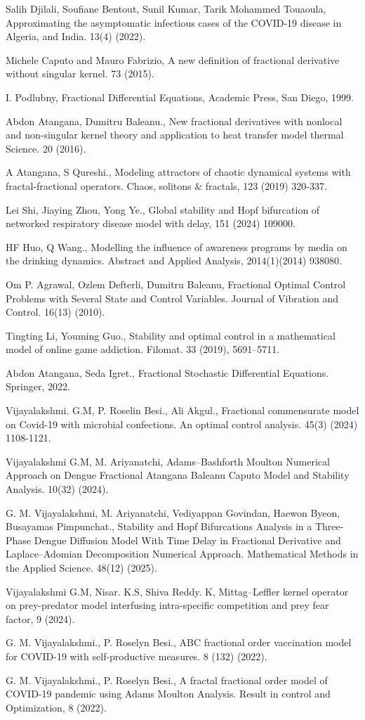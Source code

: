 \documentclass[10pt]{NSP1}
\begin{document}
Salih Djilali, Soufiane Bentout, Sunil Kumar, Tarik Mohammed Touaoula, Approximating the asymptomatic infectious cases of the COVID-19 disease in Algeria, and India. 13(4) (2022).

Michele Caputo and Mauro Fabrizio, A new definition of fractional derivative without singular kernel. 73 (2015).

I. Podlubny, Fractional Differential Equations, Academic Press, San Diego, 1999.

Abdon Atangana, Dumitru Baleanu., New fractional derivatives with nonlocal and non-singular kernel theory and application to heat transfer model thermal Science. 20 (2016).

A Atangana, S Qureshi., Modeling attractors of chaotic dynamical systems with fractal-fractional operators. Chaos, solitons \& fractals, 123 (2019) 320-337.

Lei Shi, Jiaying Zhou, Yong Ye., Global stability and Hopf bifurcation of networked respiratory disease model with delay, 151 (2024) 109000.

HF Huo, Q Wang., Modelling the influence of awareness programs by media on the drinking dynamics. Abstract and Applied Analysis, 2014(1)(2014) 938080.

Om P. Agrawal, Ozlem Defterli, Dumitru Baleanu, Fractional Optimal Control Problems with Several State and Control Variables. Journal of Vibration and Control. 16(13) (2010).

Tingting Li, Youming Guo., Stability and optimal control in a mathematical model of online game addiction. Filomat. 33 (2019), 5691–5711.

Abdon Atangana, Seda Igret., Fractional Stochastic Differential Equations. Springer, 2022.

Vijayalakshmi. G.M, P. Roselin Besi., Ali Akgul., Fractional commensurate model on Covid-19 with microbial confections. An optimal control analysis. 45(3) (2024) 1108-1121.

Vijayalakshmi G.M, M. Ariyanatchi, Adams–Bashforth Moulton Numerical Approach on Dengue Fractional Atangana Baleanu Caputo Model and Stability Analysis. 10(32) (2024).

G. M. Vijayalakshmi, M. Ariyanatchi, Vediyappan Govindan, Haewon Byeon, Busayamas Pimpunchat., Stability and Hopf Bifurcations Analysis in a Three-Phase Dengue Diffusion Model With Time Delay in Fractional Derivative and Laplace–Adomian Decomposition Numerical Approach. Mathematical Methods in the Applied Science. 48(12) (2025).

Vijayalakshmi G.M, Nisar. K.S, Shiva Reddy. K, Mittag–Leffler kernel operator on prey-predator model interfusing intra-specific competition and prey fear factor, 9 (2024).

G. M. Vijayalakshmi., P. Roselyn Besi., ABC fractional order vaccination model for COVID-19 with self-productive measures. 8 (132) (2022).

G. M. Vijayalakshmi., P. Roselyn Besi., A fractal fractional order model of COVID-19 pandemic using Adams Moulton Analysis. Result in control and Optimization, 8 (2022).
\end{document}

